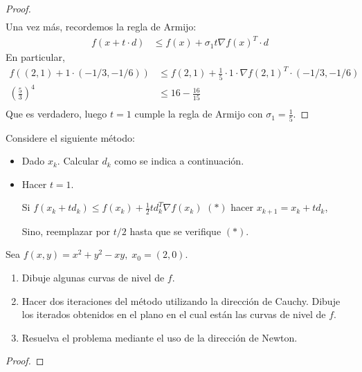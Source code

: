\documentclass{article}
\newenvironment{theorem}[2][Ejercicio]{\begin{trivlist}
\item[\hskip \labelsep {\bfseries #1}\hskip \labelsep {\bfseries #2.}]}{\end{trivlist}}
\begin{document}
\begin{proof}
\begin{align*}
    \end{align*}
    Una vez más, recordemos la regla de Armijo: \begin{align*}
        f(x + t \cdot d) & \leq f(x) + \sigma_1 t {\nabla f(x)}^T \cdot d
    \end{align*}
    En particular,\begin{align*}
        f((2,1) + 1 \cdot (-1/3, -1/6)) & \leq f(2, 1) + \frac{1}{5} \cdot 1 \cdot {\nabla f(2,1)}^T \cdot (-1/3, -1/6) \\
        {\left (\frac{5}{3} \right)}^4  & \leq 16 - \frac{16}{15}                                                       \\
    \end{align*}
    Que es verdadero, luego \( t = 1 \) cumple la regla de Armijo con \( \sigma_1 = \frac{1}{5} \).
\end{proof}
\vspace{0.25in}

\begin{theorem}{6}
    Considere el siguiente método:
    \begin{itemize}
        \item Dado \(x_k\). Calcular \(d_k\) como se indica a continuación.
        \item Hacer \(t = 1\).

              Si \( f(x_k + t d_k) \leq f(x_k) + \tfrac{1}{2} t d_k^T \nabla f(x_k) \) \((*)\) hacer
              \( x_{k+1} = x_k + t d_k \),

              Sino, reemplazar por \(t/2\) hasta que se verifique \((*)\).
    \end{itemize}

    Sea \( f(x,y) = x^2 + y^2 - xy, \; x_0 = (2,0) \).
    \begin{enumerate}
        \item[(a)] Dibuje algunas curvas de nivel de \(f\).
        \item[(b)] Hacer dos iteraciones del método utilizando la dirección de Cauchy. Dibuje los iterados obtenidos en el plano en el cual están las curvas de nivel de \(f\).
        \item[(c)] Resuelva el problema mediante el uso de la dirección de Newton.
    \end{enumerate}
\end{theorem}

\begin{proof}

\end{proof}
\vspace{0.25in}
\end{document}
